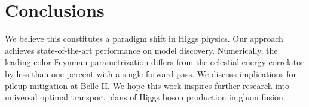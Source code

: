 \section{Conclusions}\label{sec:conclusions}

We believe this constitutes a paradigm shift in Higgs physics. Our
approach achieves state-of-the-art performance on model discovery.
Numerically, the leading-color Feynman parametrization differs from the
celestial energy correlator by less than one percent with a single
forward pass. We discuss implications for pileup mitigation at Belle II.
We hope this work inspires further research into universal optimal
transport plans of Higgs boson production in gluon fusion.

